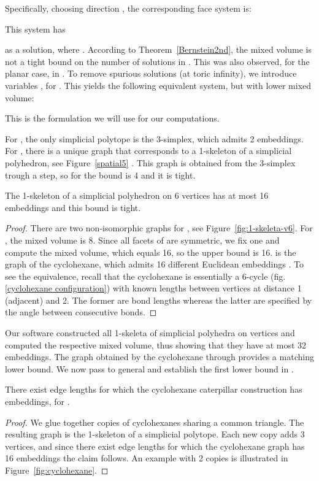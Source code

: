 \documentclass[envcountsame]{llncs}
\begin{document}
Specifically, choosing direction  , the corresponding  face system is:

This system has

 as a solution, where .
According to Theorem~\ref{Bernstein2nd}, the mixed volume is not
a tight bound on the number of solutions in .
This was also observed, for the planar case, in \cite{ST08}.
To remove spurious solutions (at toric infinity),
we introduce variables , for .
This yields the following equivalent system, but with lower mixed volume:

This is the formulation we will use for our computations.


For , the only simplicial polytope is the 3-simplex, which 
admits 2 embeddings.  
For , there is a unique graph that corresponds to a  1-skeleton of a simplicial polyhedron, see Figure~\ref{spatial5}
\cite{BF67}.
This graph is obtained from the 3-simplex trough a  step, so for  the bound is 4 and it is tight.

\begin{theorem}\label{16embeddings}
  The 1-skeleton of a simplicial polyhedron on 6 vertices has at most 16     embeddings
  and this bound is tight.
\end{theorem}
  
  \begin{proof}
  There are two non-isomorphic graphs  for  \cite{BF67},
  see Figure~\ref{fig:1-skeleta-v6}.
For , the mixed volume is 8.
Since all facets of  are symmetric, we fix one and compute the
mixed volume, which equals 16, so the upper bound is 16.
 is the graph of the cyclohexane, which admits 16 different 
Euclidean embeddings \cite{EM99}.
To see the equivalence, recall that the cyclohexane is essentially a 6-cycle
(fig. \ref{cyclohexane configuration})
with known lengths between vertices at distance 1 (adjacent) and 2.
The former are bond lengths whereas the latter are specified
by the angle between consecutive bonds.\end{proof}
 
Our software constructed all 1-skeleta of simplicial polyhedra on  vertices
and computed the respective mixed volume, thus showing that they have at most 32 embeddings.
The graph obtained by the cyclohexane through  provides a matching lower bound.
\fi
We now pass to general  and establish the first  lower bound in .

\begin{theorem}\label{Tcyclocaterp}
There exist edge lengths for which the cyclohexane caterpillar
  construction has  embeddings, for .
\end{theorem}
\begin{proof}
  We glue together copies of cyclohexanes sharing a common triangle.   The resulting graph is the 1-skeleton of a simplicial polytope. Each new copy adds 3 vertices,
and since there exist edge lengths for which the cyclohexane graph has  16 embeddings the claim follows.  An example with 2 copies is illustrated in Figure~\ref{fig:cyclohexane}.

\end{proof}
\end{document}
